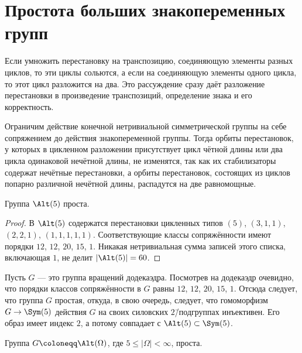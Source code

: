 \documentclass[
	extrafontsizes,
	11pt,
	hyphens,
]{memoir}
\begin{document}
\section{Простота больших знакопеременных групп}

\begin{observation}
Если умножить перестановку на транспозицию, соединяющую элементы разных циклов, то эти
циклы сольются, а если на соединяющую элементы одного цикла, то этот цикл
разложится на два. Это рассуждение сразу даёт
разложение перестановки в произведение транспозиций, определение знака и его корректность.
\end{observation}

\begin{observation} \label{obs:AltConjClasses}
Ограничим действие конечной нетривиальной симметрической группы на себе сопряжением до действия знакопеременной группы.
Тогда орбиты перестановок, у которых в цикленном разложении присутствует цикл чётной длины или два цикла одинаковой нечётной длины, не изменятся,
так как
их стабилизаторы содержат нечётные перестановки,
а орбиты перестановок, состоящих из циклов попарно различной нечётной длины, распадутся на две равномощные.
\end{observation}

\begin{lemma} \label{lem:AltFiveSimple}
Группа \(\Alt(5)\) проста.
\end{lemma}

\begin{proof}
В \(\Alt(5)\) содержатся перестановки цикленных типов
\((5)\), \((3,1,1)\), \((2,2,1)\), \((1,1,1,1,1)\).
Соответствующие классы сопряжённости имеют порядки
\(12\), \(12\), \(20\), \(15\), \(1\). Никакая нетривиальная сумма записей этого списка, включающая \(1\), не делит \(\lvert \Alt(5) \rvert = 60\).
\end{proof}

\begin{remark}
Пусть \(G\) --- это группа вращений додекаэдра.
Посмотрев на додекаэдр очевидно, что порядки классов сопряжённости в \(G\) равны \(12\), \(12\), \(20\), \(15\), \(1\).
Отсюда следует, что группа \(G\) простая, откуда, в свою очередь, следует, что гомоморфизм \(G \to \Sym(5)\) действия \(G\) на своих силовских \(2\)\=/подгруппах инъективен. Его образ имеет индекс \(2\), а потому совпадает с \(\Alt(5) \subset \Sym(5)\).
\end{remark}

\begin{theorem}
Группа \(G \coloneqq \Alt(\Omega)\), где \(5 \leq \lvert \Omega \rvert < \infty\), проста.
\end{theorem}
\end{document}
